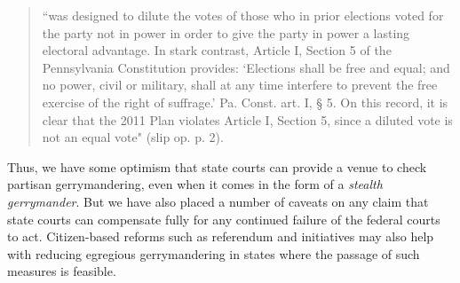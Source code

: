     \begin{quote}
        ``was designed to dilute the votes of those who in prior elections voted for the party not in power in order to give the party in power a lasting electoral advantage. In stark contrast, Article I, Section 5 of the Pennsylvania Constitution provides: ‘Elections shall be free and equal; and no power, civil or military, shall at any time interfere to prevent the free exercise of the right of suffrage.’ Pa. Const. art. I, § 5. On this record, it is clear that the 2011 Plan violates Article I, Section 5, since a diluted vote is not an equal vote" (slip op. p. 2).
    \end{quote}
\par
	Thus, we have some optimism that state courts can provide a venue to check partisan gerrymandering, even when it comes in the form of a \textit{stealth gerrymander}. But we have also placed a number of caveats on any claim that state courts can compensate fully for any continued failure of the federal courts to act. Citizen-based reforms such as referendum and initiatives may also help with reducing egregious gerrymandering in states where the passage of such measures is feasible.
